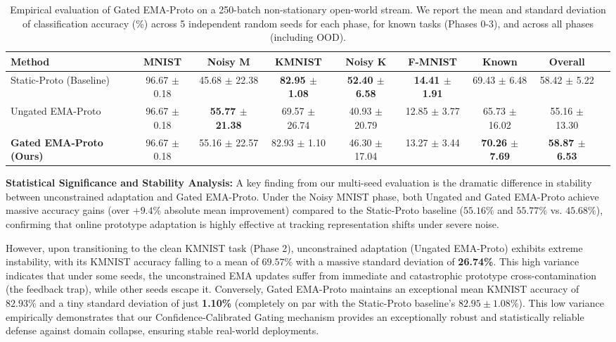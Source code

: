 \documentclass{article}
\theoremstyle{plain}
\theoremstyle{definition}
\theoremstyle{remark}
\begin{document}
\begin{table}[t]
\caption{Empirical evaluation of Gated EMA-Proto on a 250-batch non-stationary open-world stream. We report the mean and standard deviation of classification accuracy (\%) across 5 independent random seeds for each phase, for known tasks (Phases 0-3), and across all phases (including OOD).}
\label{tab:results}
\vskip 0.15in
\begin{center}
\begin{scriptsize}
\begin{sc}
\setlength{\tabcolsep}{1.0pt}
\begin{tabular}{lcccccccc}
\toprule
Method & MNIST & Noisy M & KMNIST & Noisy K & F-MNIST & Known & Overall \\
\midrule
Static-Proto (Baseline) & 96.67 $\pm$ 0.18 & 45.68 $\pm$ 22.38 & \textbf{82.95 $\pm$ 1.08} & \textbf{52.40 $\pm$ 6.58} & \textbf{14.41 $\pm$ 1.91} & 69.43 $\pm$ 6.48 & 58.42 $\pm$ 5.22 \\
Ungated EMA-Proto & 96.67 $\pm$ 0.18 & \textbf{55.77 $\pm$ 21.38} & 69.57 $\pm$ 26.74 & 40.93 $\pm$ 20.79 & 12.85 $\pm$ 3.77 & 65.73 $\pm$ 16.02 & 55.16 $\pm$ 13.30 \\
\textbf{Gated EMA-Proto (Ours)} & 96.67 $\pm$ 0.18 & 55.16 $\pm$ 22.57 & 82.93 $\pm$ 1.10 & 46.30 $\pm$ 17.04 & 13.27 $\pm$ 3.44 & \textbf{70.26 $\pm$ 7.69} & \textbf{58.87 $\pm$ 6.53} \\
\bottomrule
\end{tabular}
\end{sc}
\end{scriptsize}
\end{center}
\vskip -0.1in
\end{table}

\textbf{Statistical Significance and Stability Analysis:} 
A key finding from our multi-seed evaluation is the dramatic difference in stability between unconstrained adaptation and Gated EMA-Proto. Under the Noisy MNIST phase, both Ungated and Gated EMA-Proto achieve massive accuracy gains (over $+9.4\%$ absolute mean improvement) compared to the Static-Proto baseline ($55.16\%$ and $55.77\%$ vs. $45.68\%$), confirming that online prototype adaptation is highly effective at tracking representation shifts under severe noise.

However, upon transitioning to the clean KMNIST task (Phase 2), unconstrained adaptation (Ungated EMA-Proto) exhibits extreme instability, with its KMNIST accuracy falling to a mean of $69.57\%$ with a massive standard deviation of \textbf{26.74\%}. This high variance indicates that under some seeds, the unconstrained EMA updates suffer from immediate and catastrophic prototype cross-contamination (the feedback trap), while other seeds escape it. Conversely, Gated EMA-Proto maintains an exceptional mean KMNIST accuracy of $82.93\%$ and a tiny standard deviation of just \textbf{1.10\%} (completely on par with the Static-Proto baseline's $82.95 \pm 1.08\%$). This low variance empirically demonstrates that our Confidence-Calibrated Gating mechanism provides an exceptionally robust and statistically reliable defense against domain collapse, ensuring stable real-world deployments. 
\end{document}
